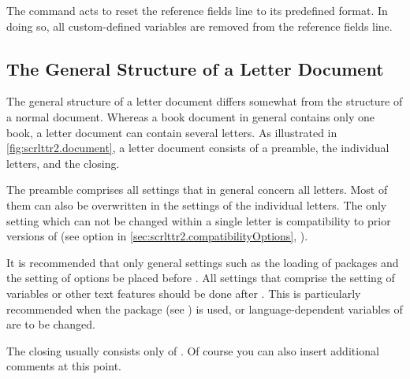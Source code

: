 The command  acts to reset the reference
fields line to its predefined format. In doing so, all custom-defined
variables are removed from the reference fields line.
%
%
%
%
%


\subsection{The General Structure of a Letter Document}
\label{sec:scrlttr2.document}

The general structure of a letter document differs somewhat from the
structure of a normal document. Whereas a book document in general
contains only one book, a letter document can contain several
letters. As illustrated in \autoref{fig:scrlttr2.document}, a letter
document consists of a preamble, the individual letters, and the
closing.

The preamble comprises all settings that in general concern all letters. Most
of them can also be overwritten in the settings of the individual letters. The
only setting which can not be changed within a single letter is compatibility
to prior versions of  (see option  in
\autoref{sec:scrlttr2.compatibilityOptions},
).

It is recommended that only general settings such as the loading of packages
and the setting of options be placed before
. All settings that comprise the setting of
variables or other text features should be done after
. This is particularly recommended when the
 package (see \cite{package:babel}) is
used, or language-dependent variables of  are to be changed.

The closing usually consists only of
. Of course you can also insert
additional comments at this point.

